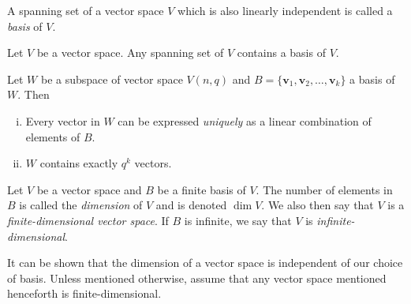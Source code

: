 \begin{definition}
    A spanning set of a vector space $V$ which is also linearly independent is called a \textit{basis} of $V$.
\end{definition}

\begin{theorem}
    Let $V$ be a vector space. Any spanning set of $V$ contains a basis of $V$.
\end{theorem}

\begin{theorem}
    Let $W$ be a subspace of vector space $V(n,q)$ and $B=\{\textbf{v}_1,\textbf{v}_2,\ldots,\textbf{v}_k\}$ a basis of $W$. Then
    \begin{enumerate}[(i)]
        \item Every vector in $W$ can be expressed \textit{uniquely} as a linear combination of elements of $B$.
        \item $W$ contains exactly $q^k$ vectors.
    \end{enumerate}
\end{theorem}

\begin{definition}
    Let $V$ be a vector space and $B$ be a finite basis of $V$. The number of elements in $B$ is called the \textit{dimension} of $V$ and is denoted $\dim V$. We also then say that $V$ is a \textit{finite-dimensional vector space}. If $B$ is infinite, we say that $V$ is \textit{infinite-dimensional}.
\end{definition}

It can be shown that the dimension of a vector space is independent of our choice of basis. Unless mentioned otherwise, assume that any vector space mentioned henceforth is finite-dimensional.

